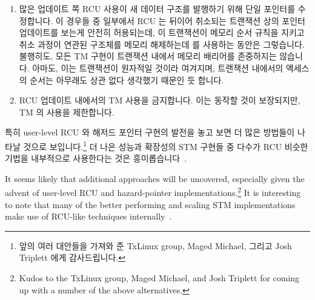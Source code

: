 \begin{enumerate}
\fi

\item	많은 업데이트 쪽 RCU 사용이 새 데이터 구조를 발행하기 위해 단일
	포인터를 수정합니다.
	이 경우들 중 일부에서 RCU 는 뒤이어 취소되는 트랜잭션 상의 포인터
	업데이트를 보는게 안전히 허용되는데, 이 트랜잭션이 메모리 순서 규칙을
	지키고 취소 과정이 연관된 구조체를 메모리 해제하는데  를
	사용하는 동안은 그렇습니다.
	불행히도, 모든 TM 구현이 트랜잭션 내에서 메모리 배리어를 존중하지는
	않습니다.
	아마도, 이는 트랜잭션이 원자적일 것이라 여겨지며, 트랜잭션 내에서의
	액세스의 순서는 아무래도 상관 없다 생각했기 때문인 듯 합니다.
\item	RCU 업데이트 내에서의 TM 사용을 금지합니다.
	이는 동작할 것이 보장되지만, TM 의 사용을 제한합니다.

\end{enumerate}

특히 user-level RCU 와 해저드 포인터 구현의 발전을 놓고 보면 더 많은 방법들이
나타날 것으로 보입니다.\footnote{
	앞의 여러 대안들을 가져와 준 TxLinux group, Maged Michael, 그리고 Josh
	Triplett 에게 감사드립니다.}
더 나은 성능과 확장성의 STM 구현들 중 다수가 RCU 비슷한 기법을 내부적으로
사용한다는 것은 흥미롭습니다~\cite{UCAM-CL-TR-579,KeirFraser2007withoutLocks,Gu:2019:PSE:3358807.3358885,Kim:2019:MSR:3297858.3304040}.

\iffalse

It seems likely that additional approaches will be uncovered, especially
given the advent of user-level RCU and hazard-pointer
implementations.\footnote{
	Kudos to the TxLinux group, Maged Michael, and Josh Triplett
	for coming up with a number of the above alternatives.}
It is interesting to note that many of the better performing and
scaling STM implementations make use of RCU-like techniques
internally~\cite{UCAM-CL-TR-579,KeirFraser2007withoutLocks,Gu:2019:PSE:3358807.3358885,Kim:2019:MSR:3297858.3304040}.

